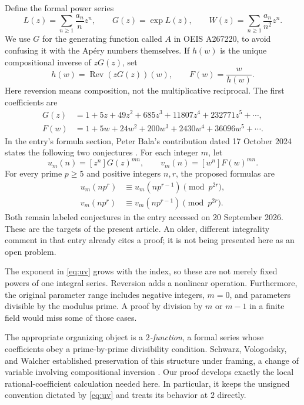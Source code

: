 \documentclass[11pt,letterpaper]{article}
\numberwithin{equation}{section}
\theoremstyle{definition}
\theoremstyle{remark}
\newcommand{\Rev}{\operatorname{Rev}}
\begin{document}
Define the formal power series
\begin{equation}\label{eq:basic-series}
 L(z)=\sum_{n\ge1}\frac{a_n}{n}z^n,
 \qquad G(z)=\exp L(z),
 \qquad W(z)=\sum_{n\ge1}\frac{a_n}{n^2}z^n.
\end{equation}
We use $G$ for the generating function called $A$ in OEIS A267220, to
avoid confusing it with the Ap\'ery numbers themselves. If $h(w)$ is the
unique compositional inverse of $zG(z)$, set
\begin{equation}\label{eq:F}
 h(w)=\Rev(zG(z))(w),\qquad F(w)=\frac{w}{h(w)}.
\end{equation}
Here reversion means composition, not the multiplicative reciprocal.
The first coefficients are
\begin{align*}
 G(z)&=1+5z+49z^2+685z^3+11807z^4+232771z^5+\cdots,\\
 F(w)&=1+5w+24w^2+200w^3+2430w^4+36096w^5+\cdots.
\end{align*}
In the entry's formula section, Peter Bala's contribution dated
17 October 2024 states the following two conjectures \cite{oeis-target}.
For each integer $m$, let
\begin{equation}\label{eq:uv}
 u_m(n)=[z^n]G(z)^{mn},\qquad
 v_m(n)=[w^n]F(w)^{mn}.
\end{equation}
For every prime $p\ge5$ and positive integers $n,r$, the proposed formulas are
\begin{align}
 u_m(np^r)&\equiv u_m(np^{r-1})\pmod{p^{2r}},\label{eq:conj-u}\\
 v_m(np^r)&\equiv v_m(np^{r-1})\pmod{p^{2r}}.\label{eq:conj-v}
\end{align}
Both remain labeled conjectures in the entry accessed on
20 September 2026. These are the targets of the present article. An older,
different integrality comment in that entry already cites a proof; it is
not being presented here as an open problem.

The exponent in \eqref{eq:uv} grows with the index, so these are not merely
fixed powers of one integral series. Reversion adds a nonlinear operation.
Furthermore, the original parameter range includes negative integers,
$m=0$, and parameters divisible by the modulus prime. A proof by division
by $m$ or $m-1$ in a finite field would miss some of those cases.

The appropriate organizing object is a \emph{$2$-function}, a formal
series whose coefficients obey a prime-by-prime divisibility condition.
Schwarz, Vologodsky, and Walcher established preservation of this
structure under framing, a change of variable involving compositional
inversion \cite{svw2013,svw2017}. Our proof develops exactly the local
rational-coefficient calculation needed here. In particular, it keeps the
unsigned convention dictated by \eqref{eq:uv} and treats its behavior at
$2$ directly.
\end{document}
